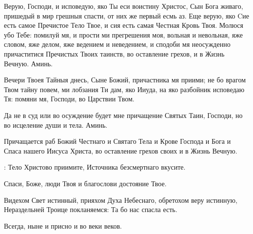 \begin{mymulticols}

 Верую, Господи, и исповедую, яко Ты еси воистину Христос, Сын Бога живаго, пришедый в мир грешныя спасти, от них же первый есмь аз. Еще верую, яко Cие есть самое Пречистое Тело Твое, и сия есть самая Честная Кровь Твоя. Молюся убо Тебе: помилуй мя, и прости ми прегрешения моя, вольная и невольная, яже словом, яже делом, яже ведением и неведением, и сподоби мя неосужденно причаститися Пречистых Твоих таинств, во оставление грехов, и в Жизнь Вечную. Аминь.

Вечери Твоея Тайныя днесь, Сыне Божий, причастника мя приими; не бо врагом Твом тайну повем, ми лобзания Ти дам, яко Ииуда, на яко разбойник исповедаю Тя: помяни мя, Господи, во Царствии Твом.

Да не в суд или во осуждение будет мне причащение Святых Таин, Господи, но во исцеление души и тела. Аминь.


 Причащается раб Божий  Честнаго и Святаго Тела и Крове Господа и Бога и Спаса нашего Иисуса Христа, во оставление грехов своих и в Жизнь Вечную. 

: Тело Христово приимите, Источника безсмертнаго вкусите.


 Спаси, Боже, люди Твоя и благослови достояние Твое.


 Видехом Свет истинный, прияхом Духа Небеснаго, обретохом веру истинную, Нераздельней Троице покланяемся: Та бо нас спасла есть.


 Всегда, ныне и присно и во веки веков.


\end{mymulticols}
